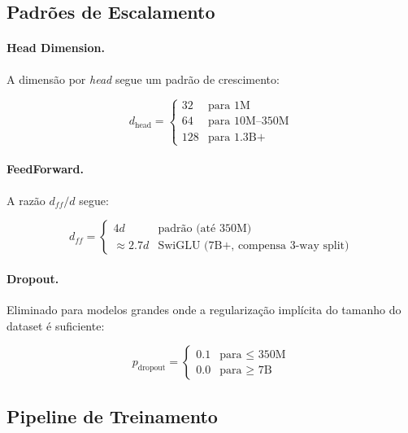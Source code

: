 \subsection{Padr\~oes de Escalamento}

\paragraph{Head Dimension.}
A dimens\~ao por \textit{head} segue um padr\~ao de crescimento:

\begin{equation}
    d_{\text{head}} = \begin{cases}
        32 & \text{para 1M} \\
        64 & \text{para 10M--350M} \\
        128 & \text{para 1.3B+}
    \end{cases}
\end{equation}

\paragraph{FeedForward.}
A raz\~ao $d_{ff} / d$ segue:

\begin{equation}
    d_{ff} = \begin{cases}
        4d & \text{padr\~ao (at\'e 350M)} \\
        \approx 2.7d & \text{SwiGLU (7B+, compensa 3-way split)}
    \end{cases}
\end{equation}

\paragraph{Dropout.}
Eliminado para modelos grandes onde a regulariza\c{c}\~ao impl\'icita do
tamanho do dataset \'e suficiente:

\begin{equation}
    p_{\text{dropout}} = \begin{cases}
        0.1 & \text{para $\leq$ 350M} \\
        0.0 & \text{para $\geq$ 7B}
    \end{cases}
\end{equation}

\subsection{Pipeline de Treinamento}

